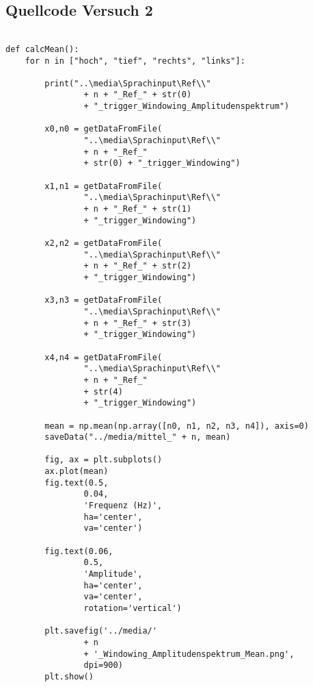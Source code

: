 \documentclass[12pt, oneside, a4paper, \docLanguage]{report}
\begin{document}
\subsection{Quellcode Versuch 2}
\label{chap:APPENDIX_SOURCECODE_V2}

\begin{verbatim}

def calcMean():
    for n in ["hoch", "tief", "rechts", "links"]:
    
        print("..\media\Sprachinput\Ref\\" 
        		+ n + "_Ref_" + str(0) 
        		+ "_trigger_Windowing_Amplitudenspektrum")
        
        x0,n0 = getDataFromFile(
        		"..\media\Sprachinput\Ref\\" 
        		+ n + "_Ref_" 
        		+ str(0) + "_trigger_Windowing")
        
        x1,n1 = getDataFromFile(
        		"..\media\Sprachinput\Ref\\" 
        		+ n + "_Ref_" + str(1) 
        		+ "_trigger_Windowing")        
        
        x2,n2 = getDataFromFile(
        		"..\media\Sprachinput\Ref\\" 
        		+ n + "_Ref_" + str(2) 
        		+ "_trigger_Windowing")
        
        x3,n3 = getDataFromFile(
        		"..\media\Sprachinput\Ref\\" 
        		+ n + "_Ref_" + str(3) 
        		+ "_trigger_Windowing")
        
        x4,n4 = getDataFromFile(
        		"..\media\Sprachinput\Ref\\" 
        		+ n + "_Ref_" 
        		+ str(4) 
        		+ "_trigger_Windowing")
        
        mean = np.mean(np.array([n0, n1, n2, n3, n4]), axis=0)
        saveData("../media/mittel_" + n, mean)
        
        fig, ax = plt.subplots()
        ax.plot(mean)
        fig.text(0.5, 
        		0.04, 
        		'Frequenz (Hz)', 
        		ha='center', 
        		va='center')
        		
        fig.text(0.06, 
        		0.5, 
        		'Amplitude', 
        		ha='center', 
        		va='center', 
        		rotation='vertical')
        		
        plt.savefig('../media/' 
        		+ n 
        		+ '_Windowing_Amplitudenspektrum_Mean.png', 
        		dpi=900)
        plt.show()



\end{verbatim}
\end{document}
